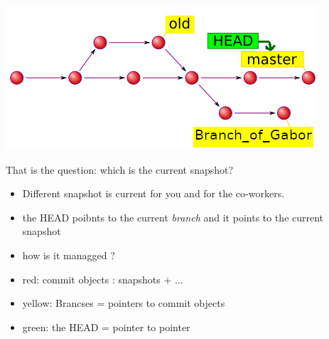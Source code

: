 \documentclass[aspectratio=169]{beamer}
\begin{document}
\begin{frame}

	\noindent\begin{minipage}{0.5\textwidth}
	\includegraphics[width=\linewidth]{pictures/git-head-1.png}
	\end{minipage}%
	\hfill%
	\begin{minipage}{0.45\textwidth}\raggedleft
	  \begin{block}{That is the  question:}
	  	which is the current snapshot?
	  \end{block}
	  \begin{itemize}
		  \item Different snapshot is current for you and for the co-workers.
		  \item the HEAD poibnts to the current \textit{branch} and it points to the current  snapshot 
		  \item how is it managged ?
  	  \end{itemize}
	
	\end{minipage}
	
	  \begin{itemize}
		  \item red: commit objects : snapshots + ...
		  \item yellow: Brancses = pointers to commit objects
		  \item green: the HEAD = pointer to pointer
  	  \end{itemize}
	
	
\end{frame}
\end{document}

